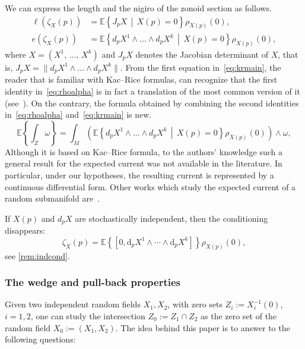 \documentclass[AHL, Unicode, longabstracts, published]{cedram}
\newcommand{\EE}{\mathbb{E}}
\newcommand{\dd}{\mathrm{d}}
\begin{document}
We can express the length and the nigiro of the zonoid section as follows.
\begin{equation}\label{eq:krmain}
\begin{split}
\ell(\zeta_X(p))&=\EE\left\{ J_pX\,\middle|\,X(p)=0\right\}\rho_{X(p)}(0), \\
e(\zeta_X(p))&=\EE\left\{ d_pX^1\wedge \dots \wedge d_pX^k\,\middle|\,X(p)=0\right\}\rho_{X(p)}(0),
\end{split}
\end{equation}
where $X=(X^1,\,\ldots,\,X^k)$ and $J_pX$ denotes the Jacobian determinant of $X$, that is, $J_pX=\|d_pX^1\wedge \dots \wedge d_pX^k\|$. From the first equation in~\eqref{eq:krmain}, the reader that is familiar with Kac--Rice formulas, can recognize that the first identity in~\eqref{eq:rhoalpha} is in fact a translation of the most common version of it (see~\cite{AzaisWscheborbook}). On the contrary, the formula obtained by combining the second identities in~\eqref{eq:rhoalpha} and~\eqref{eq:krmain} is new.
\begin{equation}\label{eq:newEcurrent}
\EE\left\{\int_{Z} \omega\right\}=\int_M\left(\EE\left\{ d_pX^1\wedge \dots \wedge d_pX^k\,\middle|\,X(p)=0\right\}\rho_{X(p)}(0)\right)\wedge \omega,
\end{equation}
Although it is based on Kac--Rice formula, to the authors' knowledge such a general result for the expected current was not available in the literature. In particular, under our hypotheses, the resulting current is represented by a continuous differential form. Other works which study the expected current of a random submanifold are~\cite{Ancona_pencils,Dinh2012,
DangRiv2018,LETENDRE2016,Nicolaescu2016, NicSavale,Shiffman1999-hu,Shiffman2008-ru}.
\begin{rema}
If $X(p) $ and $d_pX$ are stochastically independent, then the conditioning disappears:
\[
\zeta_X(p)=\EE\left\{\left[0,\dd_pX^1\wedge\cdots\wedge\dd_p X^k\right] \right\}\rho_{X(p)}(0),
\]
see \cref{rem:indcond}.
\end{rema}

\subsubsection{The wedge and pull-back properties}

Given two independent random fields $X_1,X_2$, with zero sets $Z_i:=X_i^{-1}(0)$, $i=1,2$, one can study the intersection $Z_0:=Z_1\cap Z_2$ as the zero set of the random field $X_0:=(X_1,X_2)$. The idea behind this paper is to answer to the following questions:
\end{document}
